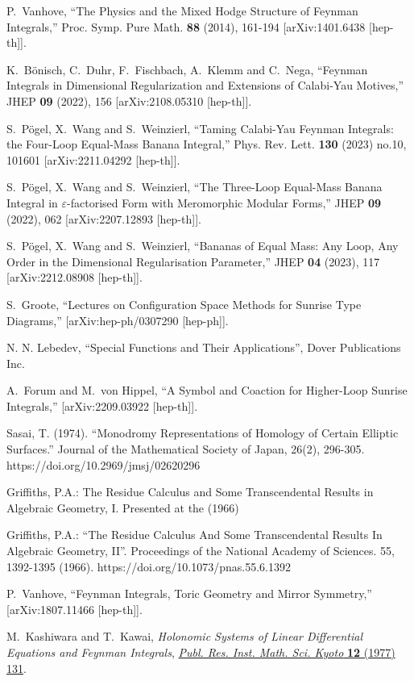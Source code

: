 \documentclass[a4paper,12pt]{article}
\numberwithin{equation}{section}
\numberwithin{figure}{section}
\begin{document}
\begin{thebibliography}{99}
  
P.~Vanhove,
``The Physics and the Mixed Hodge Structure of Feynman Integrals,''
Proc. Symp. Pure Math. \textbf{88} (2014), 161-194
[arXiv:1401.6438 [hep-th]].


K.~B\"onisch, C.~Duhr, F.~Fischbach, A.~Klemm and C.~Nega,
``Feynman Integrals in Dimensional Regularization and Extensions of Calabi-Yau Motives,''
JHEP \textbf{09} (2022), 156
[arXiv:2108.05310 [hep-th]].


S.~P\"ogel, X.~Wang and S.~Weinzierl,
``Taming Calabi-Yau Feynman Integrals: the Four-Loop Equal-Mass Banana Integral,''
Phys. Rev. Lett. \textbf{130} (2023) no.10, 101601
[arXiv:2211.04292 [hep-th]].

S.~P\"ogel, X.~Wang and S.~Weinzierl,
``The Three-Loop Equal-Mass Banana Integral in \ensuremath{\varepsilon}-factorised Form with Meromorphic Modular Forms,''
JHEP \textbf{09} (2022), 062
[arXiv:2207.12893 [hep-th]].

S.~P\"ogel, X.~Wang and S.~Weinzierl,
``Bananas of Equal Mass: Any Loop, Any Order in the Dimensional Regularisation Parameter,''
JHEP \textbf{04} (2023), 117
[arXiv:2212.08908 [hep-th]].

S.~Groote,
``Lectures on Configuration Space Methods for Sunrise Type Diagrams,''
[arXiv:hep-ph/0307290 [hep-ph]].
  
 N. N. Lebedev, ``Special Functions and Their
  Applications'', Dover Publications Inc. 

A.~Forum and M.~von Hippel,
``A Symbol and Coaction for Higher-Loop Sunrise Integrals,''
[arXiv:2209.03922 [hep-th]].

 Sasai, T. (1974). ``Monodromy Representations of
  Homology of Certain Elliptic Surfaces.'' Journal of the Mathematical
  Society of Japan, 26(2),
  296-305. https://doi.org/10.2969/jmsj/02620296

   Griffiths, P.A.: The Residue Calculus and Some
    Transcendental Results in Algebraic Geometry, I. Presented at the
    (1966)

    Griffiths, P.A.: ``The Residue Calculus And Some Transcendental
    Results In Algebraic Geometry, II''. Proceedings of the National
    Academy of Sciences. 55, 1392-1395
    (1966). https://doi.org/10.1073/pnas.55.6.1392 
  
P.~Vanhove,
``Feynman Integrals, Toric Geometry and Mirror Symmetry,''
[arXiv:1807.11466 [hep-th]].


M.~Kashiwara and T.~Kawai, \emph{{Holonomic Systems of Linear Differential
		Equations and Feynman Integrals}},
\href{https://doi.org/10.2977/prims/1195196602}{\emph{Publ. Res. Inst. Math.
		Sci. Kyoto} {\bfseries 12} (1977) 131}.
	
\end{thebibliography}
\end{document}
